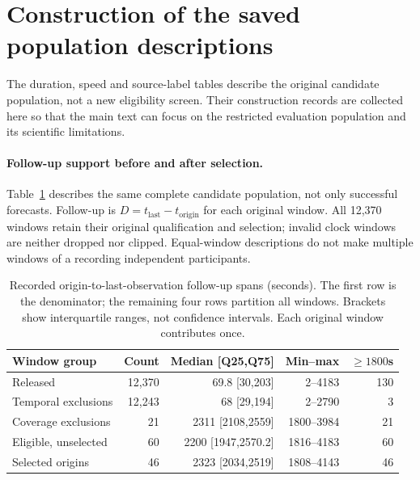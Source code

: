 \clearpage

\section{Construction of the saved population descriptions}
\label{sec:population-description-construction}\hypertarget{sec:population-description-construction}{}
The duration, speed and source-label tables describe the original candidate
population, not a new eligibility screen. Their construction records are
collected here so that the main text can focus on the restricted evaluation
population and its scientific limitations.

\paragraph{Follow-up support before and after selection.}\label{sec:final-cohort-durations}\hypertarget{sec:final-cohort-durations}{}
Table~\ref{tab:final-cohort-durations} describes the same complete candidate
population, not only successful forecasts. Follow-up is
$D=t_{\mathrm{last}}-t_{\mathrm{origin}}$ for each original window.
All 12,370 windows retain their original qualification and selection;
invalid clock windows are neither dropped nor clipped. Equal-window
descriptions do not make multiple windows of a recording independent participants.

\begin{table}[htbp]
\centering\small
\caption{Recorded origin-to-last-observation follow-up spans (seconds). The first row is the denominator; the remaining four rows partition all windows. Brackets show interquartile ranges, not confidence intervals. Each original window contributes once.}
\label{tab:final-cohort-durations}\hypertarget{tab:final-cohort-durations}{}
\begin{tabular}{@{}lrrrr@{}}
\toprule
Window group & Count & Median [Q25,Q75] & Min--max & $\geq1800$s\\
\midrule
Released & 12,370 & 69.8 [30,203] & 2--4183 & 130\\
Temporal exclusions & 12,243 & 68 [29,194] & 2--2790 & 3\\
Coverage exclusions & 21 & 2311 [2108,2559] & 1800--3984 & 21\\
Eligible, unselected & 60 & 2200 [1947,2570.2] & 1816--4183 & 60\\
Selected origins & 46 & 2323 [2034,2519] & 1808--4143 & 46\\
\bottomrule
\end{tabular}
\end{table}

